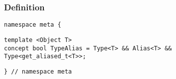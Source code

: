 
\subsubsection{Definition}

\begin{verbatim}
namespace meta {
\end{verbatim}
\begin{verbatim}
template <Object T>
concept bool TypeAlias = Type<T> && Alias<T> && Type<get_aliased_t<T>>;

\end{verbatim}
\begin{verbatim}
} // namespace meta
\end{verbatim}
